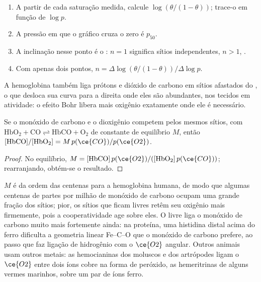 \begin{method}\label{met:b3:bioinorganic:hill-plot}
\begin{enumerate}
  \item A partir de cada saturação medida, calcule $\log(\theta/(1 - \theta))$; trace-o em função de $\log p$.
  \item A pressão em que o gráfico cruza o zero é $p_{50}$.
  \item A inclinação nesse ponto é o : $n = 1$ significa sítios
        independentes, $n > 1$, .
  \item Com apenas dois pontos, $n = \Delta\log(\theta/(1 - \theta))/\Delta\log p$.
\end{enumerate}
\end{method}

A hemoglobina também liga prótons e dióxido de carbono em sítios afastados do ,
o que desloca sua curva para a direita onde eles são abundantes, nos tecidos em atividade:
o efeito Bohr libera mais oxigênio exatamente onde ele é necessário.

\begin{proposition}\label{prop:b3:bioinorganic:haldane}
Se o monóxido de carbono e o dioxigênio competem pelos mesmos sítios, com
$\mathrm{HbO_2 + CO \rightleftharpoons HbCO + O_2}$ de constante de equilíbrio $M$, então
$[\mathrm{HbCO}]/[\mathrm{HbO_2}] = M\,p(\ce{CO})/p(\ce{O2})$.
\end{proposition}

\begin{proof}
No equilíbrio, $M = [\mathrm{HbCO}]\,p(\ce{O2})/([\mathrm{HbO_2}]\,p(\ce{CO}))$; rearranjando, obtém-se o resultado.
\end{proof}

$M$ é da ordem das centenas para a hemoglobina humana, de modo que algumas centenas de partes por
milhão de monóxido de carbono ocupam uma grande fração dos sítios; pior, os
sítios que ficam livres retêm seu oxigênio mais firmemente, pois a cooperatividade
age sobre eles. O  livre liga o monóxido de carbono muito mais fortemente ainda: na
proteína, uma histidina distal acima do ferro dificulta a geometria linear Fe--C--O
que o monóxido de carbono prefere, ao passo que faz ligação de hidrogênio com o $\ce{O2}$ angular.
Outros animais usam outros metais: as hemocianinas dos moluscos e dos artrópodes
ligam o $\ce{O2}$ entre dois íons cobre na forma de peróxido, as hemeritrinas de alguns
vermes marinhos, sobre um par de íons ferro.

